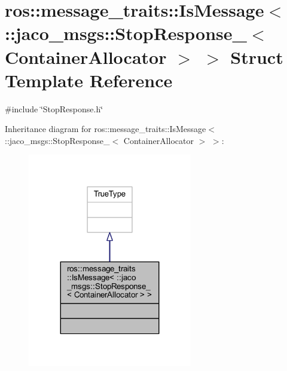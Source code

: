 \hypertarget{structros_1_1message__traits_1_1IsMessage_3_01_1_1jaco__msgs_1_1StopResponse___3_01ContainerAllocator_01_4_01_4}{}\section{ros\+:\+:message\+\_\+traits\+:\+:Is\+Message$<$ \+:\+:jaco\+\_\+msgs\+:\+:Stop\+Response\+\_\+$<$ Container\+Allocator $>$ $>$ Struct Template Reference}
\label{structros_1_1message__traits_1_1IsMessage_3_01_1_1jaco__msgs_1_1StopResponse___3_01ContainerAllocator_01_4_01_4}


{\ttfamily \#include \char`\"{}Stop\+Response.\+h\char`\"{}}



Inheritance diagram for ros\+:\+:message\+\_\+traits\+:\+:Is\+Message$<$ \+:\+:jaco\+\_\+msgs\+:\+:Stop\+Response\+\_\+$<$ Container\+Allocator $>$ $>$\+:
\nopagebreak
\begin{figure}[H]
\begin{center}
\leavevmode
\includegraphics[width=203pt]{dd/df1/structros_1_1message__traits_1_1IsMessage_3_01_1_1jaco__msgs_1_1StopResponse___3_01ContainerAllocator_01_4_01_4__inherit__graph}
\end{center}
\end{figure}


